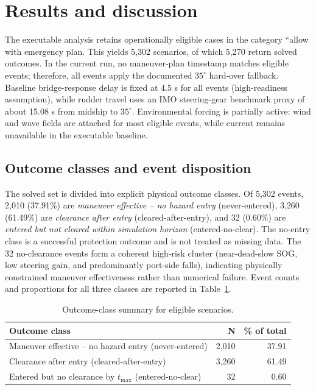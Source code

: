 \documentclass[preprint,12pt]{elsarticle}
\begin{document}
\section{Results and discussion}
The executable analysis retains operationally eligible cases in the category ``allow with emergency plan. This yields 5{,}302 scenarios, of which 5{,}270 return solved outcomes. In the current run, no maneuver-plan timestamp matches eligible events; therefore, all events apply the documented $35^{\circ}$ hard-over fallback. Baseline bridge-response delay is fixed at 4.5 s for all events (high-readiness assumption), while rudder travel uses an IMO steering-gear benchmark proxy of about 15.08 s from midship to $35^{\circ}$. Environmental forcing is partially active: wind and wave fields are attached for most eligible events, while current remains unavailable in the executable baseline.

\subsection{Outcome classes and event disposition}
The solved set is divided into explicit physical outcome classes. Of 5{,}302 events, 2{,}010 (37.91\%) are \emph{maneuver effective -- no hazard entry} (never-entered), 3{,}260 (61.49\%) are \emph{clearance after entry} (cleared-after-entry), and 32 (0.60\%) are \emph{entered but not cleared within simulation horizon} (entered-no-clear). The no-entry class is a successful protection outcome and is not treated as missing data.
The 32 no-clearance events form a coherent high-risk cluster (near-dead-slow SOG, low steering gain, and predominantly port-side falls), indicating physically constrained maneuver effectiveness rather than numerical failure. Event counts and proportions for all three classes are reported in Table~\ref{tab:outcome_classes}.

\begin{table}[H]
\centering
\caption{Outcome-class summary for eligible scenarios.}
\label{tab:outcome_classes}
\begin{tabular}{lrr}
	\toprule
Outcome class & N & \% of total \\
\midrule
Maneuver effective -- no hazard entry (never-entered) & 2{,}010 & 37.91 \\
Clearance after entry (cleared-after-entry) & 3{,}260 & 61.49 \\
Entered but no clearance by $t_{\max}$ (entered-no-clear) & 32 & 0.60 \\
\bottomrule
\end{tabular}
\end{table}
\end{document}
